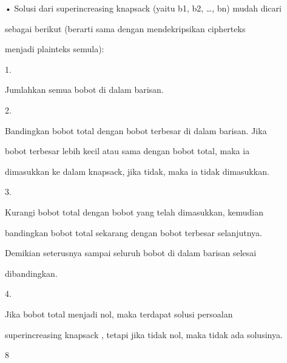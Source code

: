 \documentclass{article}
\begin{document}

• Solusi dari superincreasing knapsack (yaitu b1, b2, …, bn) mudah dicari 

sebagai berikut (berarti sama dengan mendekripsikan cipherteks 

menjadi plainteks semula): 

1.

Jumlahkan semua bobot di dalam barisan.

2.

Bandingkan bobot total dengan bobot terbesar di dalam barisan. Jika 

bobot terbesar lebih kecil atau sama dengan bobot total, maka ia 

dimasukkan ke dalam knapsack, jika tidak, maka ia tidak dimasukkan.

3.

Kurangi bobot total dengan bobot yang telah dimasukkan, kemudian 

bandingkan bobot total sekarang dengan bobot terbesar selanjutnya. 

Demikian seterusnya sampai seluruh bobot di dalam barisan selesai 

dibandingkan.

4.

Jika bobot total menjadi nol, maka terdapat solusi persoalan 

superincreasing knapsack , tetapi jika tidak nol, maka tidak ada solusinya. 

8
\end{document}
